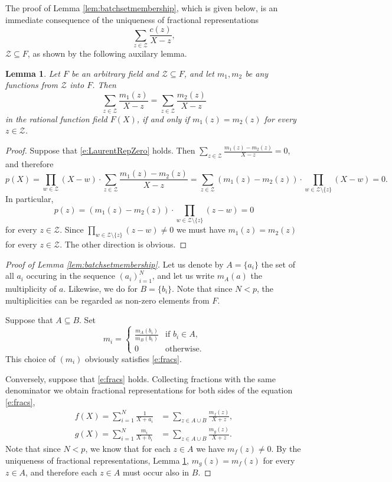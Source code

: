\documentclass[11pt]{article}
\newtheorem{lem}[]{Lemma}
\theoremstyle{definition}
\theoremstyle{remark}
\begin{document}
The proof of Lemma \ref{lem:batchsetmembership}, which is given below, is an immediate consequence of the uniqueness of fractional representations
\[
\sum_{z \in \mathcal Z} \frac{c(z)}{X - z},
\]
$\mathcal Z\subseteq F$, as shown by the following auxilary lemma.
\begin{lem}
\label{lem:UniqueFractionalRep}
Let $F$ be an arbitrary field and $\mathcal Z\subseteq F$, and let $m_1, m_2$ be any functions from $\mathcal Z$ into $F$.
Then
\begin{equation}
\label{e:LaurentRepZero}
\sum_{z\in\mathcal Z} \frac{m_1(z)}{X - z} = \sum_{z\in\mathcal Z} \frac{m_2(z)}{X - z}
\end{equation}
in the rational function field $F(X)$, if and only if $m_1(z)=m_2(z)$ for every $z\in \mathcal Z$.
\end{lem}
\begin{proof}
Suppose that \eqref{e:LaurentRepZero} holds.  
Then $\sum_{z\in\mathcal Z} \frac{m_1(z)-m_2(z)}{X - z} = 0$, and therefore
\[
p(X) = \prod_{w\in\mathcal Z} (X - w)\cdot\sum_{z\in\mathcal Z} \frac{m_1(z)-m_2(z)}{X - z} = \sum_{z\in\mathcal Z} (m_1(z)-m_2(z))\cdot \prod_{w\in\mathcal Z\setminus\{z\}} (X - w) = 0.
\]
In particular,
\[
p(z) = (m_1(z) - m_2(z)) \cdot  \prod_{w\in\mathcal Z\setminus\{z\}} (z - w)= 0
\]
for every $z\in\mathcal Z$.
Since   $\prod_{w\in\mathcal Z\setminus\{z\}} (z - w) \neq 0$ we must have $m_1(z)  = m_2(z)$ for every $z\in\mathcal Z$. 
The other direction is obvious.
\end{proof}


\begin{proof}[Proof of Lemma \ref{lem:batchsetmembership}]
Let us denote by $A=\{a_i\}$ the set of all $a_i$ occuring in the sequence $(a_i)_{i=1}^N$, and let us write 
$m_A(a)$ the multiplicity of $a$.
Likewise, we do for $B=\{b_i\}$.
Note that since $N < p$, the multiplicities can be regarded as non-zero elements from $F$.

Suppose that $A\subseteq B$. 
Set 
\[
m_i = 
\begin{cases}
\frac{m_A(b_i)}{m_B(b_i)} & \text{if }b_i\in A,
\\
0 &\text{otherwise}.
\end{cases}
\]
This choice of $(m_i)$ obviously satisfies \eqref{e:fracs}.

Conversely, suppose that \eqref{e:fracs} holds.
Collecting fractions with the same denominator we obtain fractional representations for both sides of the equation \eqref{e:fracs},  
\begin{align*}
f(X) = \sum_{i=1}^N \frac{1}{X + a_i} &= \sum_{z\in A\cup B} \frac{m_f(z)}{X + z},
\\
g(X) = \sum_{i=1}^N \frac{m_i}{X + b_i} & = \sum_{z\in A\cup B} \frac{m_g(z)}{X + z}.
\end{align*}
Note that since $N < p$, we know that for each $z\in A$ we have $m_f(z)\neq 0$. 
By the uniqueness of fractional representations,  Lemma \ref{lem:UniqueFractionalRep}, $m_g(z) = m_f(z)$ for every $z\in A$, and therefore each $z\in A$ must occur also in $B$. 
\end{proof}
\end{document}
